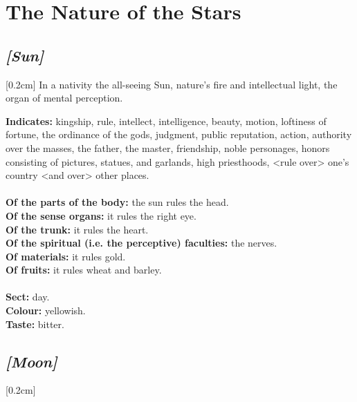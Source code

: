 
\section{The Nature of the Stars}

\subsection{\textit{[Sun]}}
[0.2cm]
In a nativity the all-seeing Sun, nature’s fire and intellectual light, the organ of mental perception.

\textbf{Indicates:} kingship, rule, intellect, intelligence, beauty, motion, loftiness of fortune, the ordinance of the gods, judgment, public reputation, action, authority over the masses, the father, the master, friendship, noble personages, honors consisting of pictures, statues, and garlands, high priesthoods, <rule over> one’s country <and over> other places. \\
\\
\textbf{Of the parts of the body:} the sun rules the head. \\
\textbf{Of the sense organs:} it rules the right eye. \\
\textbf{Of the trunk:} it rules the heart.\\
\textbf{Of the spiritual (i.e. the perceptive) faculties:} the nerves.\\
\textbf{Of materials:} it rules gold. \\
\textbf{Of fruits:} it rules wheat and barley. \\
\\
\textbf{Sect:} day. \\
\textbf{Colour:} yellowish. \\
\textbf{Taste:} bitter.
\secbr
\subsection{\textit{[Moon]}}
[0.2cm]

